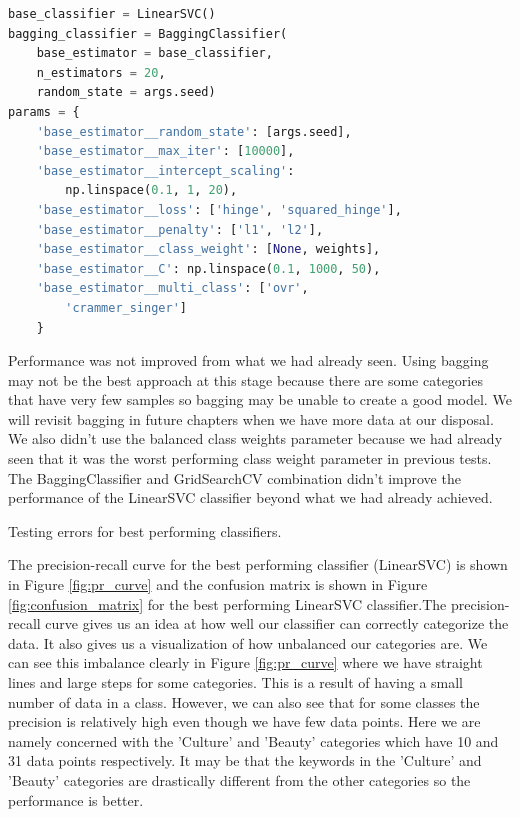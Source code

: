 \begin{lstlisting}[language=Python]
base_classifier = LinearSVC()
bagging_classifier = BaggingClassifier(
    base_estimator = base_classifier,
    n_estimators = 20, 
    random_state = args.seed)
params = {
    'base_estimator__random_state': [args.seed],
    'base_estimator__max_iter': [10000],
    'base_estimator__intercept_scaling': 
        np.linspace(0.1, 1, 20),
    'base_estimator__loss': ['hinge', 'squared_hinge'],
    'base_estimator__penalty': ['l1', 'l2'],
    'base_estimator__class_weight': [None, weights],
    'base_estimator__C': np.linspace(0.1, 1000, 50),
    'base_estimator__multi_class': ['ovr', 
        'crammer_singer']
    }
\end{lstlisting}

Performance was not improved from what we had already seen. Using bagging may not be the best approach at this stage because there are some categories that have very few samples so bagging may be unable to create a good model. We will revisit bagging in future chapters when we have more data at our disposal. We also didn't use the balanced class weights parameter because we had already seen that it was the worst performing class weight parameter in previous tests. The BaggingClassifier and GridSearchCV combination didn't improve the performance of the LinearSVC classifier beyond what we had already achieved.

\begin{table}[!ht]
\centering
\caption{Testing errors for best performing classifiers.}

\label{tab:best_errors}
\end{table}

The precision-recall curve for the best performing classifier (LinearSVC) is shown in Figure \ref{fig:pr_curve} and the confusion matrix is shown in Figure \ref{fig:confusion_matrix} for the best performing LinearSVC classifier.The precision-recall curve gives us an idea at how well our classifier can correctly categorize the data. It also gives us a visualization of how unbalanced our categories are. We can see this imbalance clearly in Figure \ref{fig:pr_curve} where we have straight lines and large steps for some categories. This is a result of having a small number of data in a class. However, we can also see that for some classes the precision is relatively high even though we have few data points. Here we are namely concerned with the 'Culture' and 'Beauty' categories which have 10 and 31 data points respectively. It may be that the keywords in the 'Culture' and 'Beauty' categories are drastically different from the other categories so the performance is better. 

